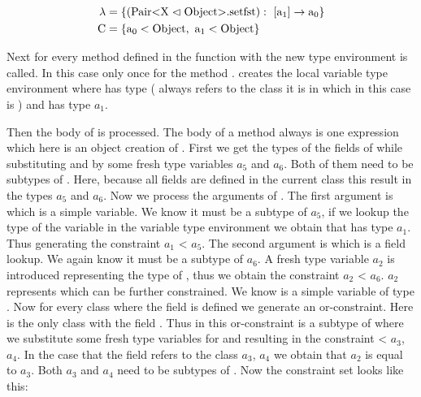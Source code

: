 \begin{align*}
    \lambda &= \{ ( \text{Pair} \text{<} \text{X} \vartriangleleft \text{Object} \text{>}. \text{setfst} ): \ [\text{a}_1] \to \text{a}_0 \}\\
    \text{C} &= \{ \text{a}_0 < \text{Object}, \ \text{a}_1 < \text{Object} \}\\
\end{align*}

Next for every method defined in  the function  with the new type environment is called.
In this case only once for the method .  creates the local variable type environment where  has type  ( always refers to the class it is in which in this case is ) and  has type $a_1$.

Then the body of  is processed. The body of a method always is one expression which here is an object creation of .
First we get the types of the fields of  while substituting  and  by some fresh type variables $a_5$ and $a_6$. Both of them need to be subtypes of . Here, because all fields are defined in the current class this result in the types $a_5$ and $a_6$. Now we process the arguments of .
The first argument is  which is a simple variable. We know it must be a subtype of $a_5$, if we lookup the type of the variable  in the variable type environment we obtain that  has type $a_1$. Thus generating the constraint $a_1$ < $a_5$.
The second argument is  which is a field lookup. We again know it must be a subtype of $a_6$. A fresh type variable $a_2$ is introduced representing the type of , thus we obtain the constraint $a_2$ < $a_6$.
$a_2$ represents  which can be further constrained. We know  is a simple variable of type .
Now for every class where the field  is defined we generate an or-constraint. Here  is the only class with the field . Thus in this or-constraint  is a subtype of  where we substitute some fresh type variables for  and  resulting in the constraint  < $a_3$, $a_4$\inl{>}.
In the case that the field  refers to the class $a_3$, $a_4$\inl{>} we obtain that $a_2$ is equal to $a_3$. Both $a_3$ and $a_4$ need to be subtypes of .
Now the constraint set looks like this:

